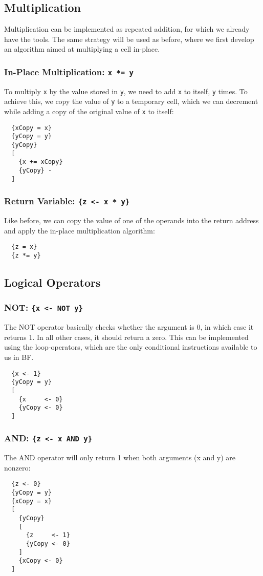 \tocless\subsection{Multiplication}
Multiplication can be implemented as repeated addition, for which we already have the tools. The same strategy will be used as before, where we first develop an algorithm aimed at multiplying a cell in-place.
\tocless\subsubsection{In-Place Multiplication: \texttt{x *= y}}
To multiply \texttt{x} by the value stored in \texttt{y}, we need to add \texttt{x} to itself, \texttt{y} times. To achieve this, we copy the value of \texttt{y} to a temporary cell, which we can decrement while adding a copy of the original value of \texttt{x} to itself:
\begin{lstlisting}
  {xCopy = x}
  {yCopy = y}
  {yCopy}
  [
    {x += xCopy}
    {yCopy} -
  ]
\end{lstlisting}

\tocless\subsubsection{Return Variable: \texttt{\{z <- x * y\}}}
Like before, we can copy the value of one of the operands into the return address and apply the in-place multiplication algorithm:
\begin{lstlisting}
  {z = x}
  {z *= y}
\end{lstlisting}

\tocless\subsection{Logical Operators}
\tocless\subsubsection{NOT: \texttt{\{x <- NOT y\}}}
The NOT operator basically checks whether the argument is 0, in which case it returns 1. In all other cases, it should return a zero. This can be implemented using the loop-operators, which are the only conditional instructions available to us in BF.
\begin{lstlisting}
  {x <- 1}
  {yCopy = y}
  [
    {x     <- 0}
    {yCopy <- 0}
  ]
\end{lstlisting}

\tocless\subsubsection{AND: \texttt{\{z <- x AND y\}}}
The AND operator will only return 1 when both arguments (x and y) are nonzero:
\begin{lstlisting}
  {z <- 0}
  {yCopy = y}
  {xCopy = x}
  [
    {yCopy}
    [
      {z     <- 1}
      {yCopy <- 0}
    ]
    {xCopy <- 0}
  ]
\end{lstlisting}

